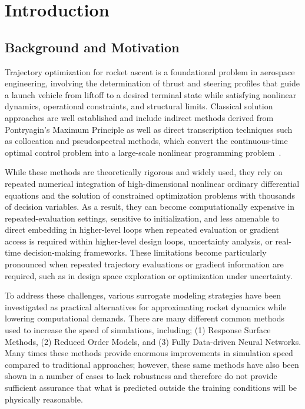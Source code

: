 
\chapter{Introduction}
\vspace{-1cm}
\doublespacing
\justifying
\section{Background and Motivation}

Trajectory optimization for rocket ascent is a foundational problem in aerospace engineering, involving 
the determination of thrust and steering profiles that guide a launch vehicle from liftoff to a desired 
terminal state while satisfying nonlinear dynamics, operational constraints, and structural limits. Classical 
solution approaches are well established and include indirect methods derived from Pontryagin’s Maximum 
Principle as well as direct transcription techniques such as collocation and pseudospectral methods, which 
convert the continuous-time optimal control problem into a large-scale nonlinear programming 
problem~\cite{bryson1975,ross2004,betts2010}.

While these methods are theoretically rigorous and widely used, they rely on repeated numerical integration 
of high-dimensional nonlinear ordinary differential equations and the solution of constrained optimization 
problems with thousands of decision variables. As a result, they can become computationally expensive in 
repeated-evaluation settings, sensitive to initialization, and less amenable to direct embedding in higher-level 
loops when repeated evaluation or gradient access is required within higher-level design 
loops, uncertainty analysis, or real-time decision-making frameworks. These limitations become particularly 
pronounced when repeated trajectory evaluations or gradient information are required, such as in design 
space exploration or optimization under uncertainty.

To address these challenges, various surrogate modeling strategies have been investigated as practical alternatives 
for approximating rocket dynamics while lowering computational demands. There are many different common methods used 
to increase the speed of simulations, including; (1) Response Surface Methods, (2) Reduced Order Models, and (3) Fully 
Data-driven Neural Networks. Many times these methods provide enormous improvements in simulation speed compared to 
traditional approaches; however, these same methods have also been shown in a number of cases to lack robustness and 
therefore do not provide sufficient assurance that what is predicted outside the training conditions will be physically 
reasonable.

